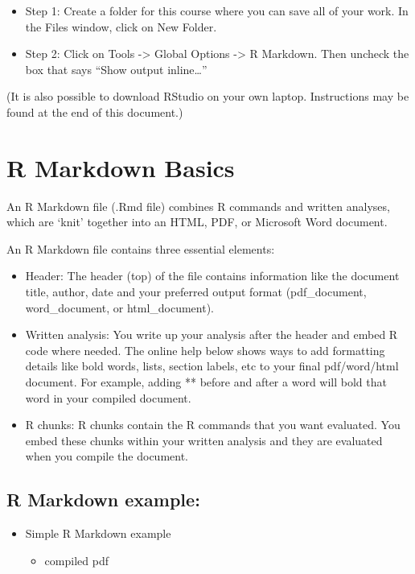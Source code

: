 \documentclass[
]{book}
\providecommand{\tightlist}{%
  \setlength{\itemsep}{0pt}\setlength{\parskip}{0pt}}
\begin{document}
\begin{itemize}
\tightlist
\item
  Step 1: Create a folder for this course where you can save all of your work. In the Files window, click on New Folder.
\item
  Step 2: Click on Tools -\textgreater{} Global Options -\textgreater{} R Markdown. Then uncheck the box that says ``Show output inline\ldots{}''
\end{itemize}

(It is also possible to download RStudio on your own laptop. Instructions may be found at the end of this document.)

\hypertarget{r-markdown-basics}{%
\section{R Markdown Basics}\label{r-markdown-basics}}

An R Markdown file (.Rmd file) combines R commands and written analyses, which are `knit' together into an HTML, PDF, or Microsoft Word document.

An R Markdown file contains three essential elements:

\begin{itemize}
\item
  Header: The header (top) of the file contains information like the document title, author, date and your preferred output format (pdf\_document, word\_document, or html\_document).
\item
  Written analysis: You write up your analysis after the header and embed R code where needed. The online help below shows ways to add formatting details like bold words, lists, section labels, etc to your final pdf/word/html document. For example, adding ** before and after a word will bold that word in your compiled document.
\item
  R chunks: R chunks contain the R commands that you want evaluated. You embed these chunks within your written analysis and they are evaluated when you compile the document.
\end{itemize}

\hypertarget{r-markdown-example}{%
\subsection{R Markdown example:}\label{r-markdown-example}}

\begin{itemize}
\tightlist
\item
  Simple R Markdown example

  \begin{itemize}
  \tightlist
  \item
    compiled pdf
  \end{itemize}
\end{itemize}
\end{document}
